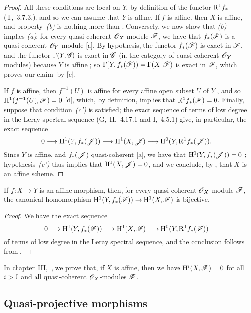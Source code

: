 \begin{proof}
\label{proof-2.5.2.2}
All these conditions are local on $Y$, by definition of the functor $\mathrm{R}^1 f_*$ (T,~3.7.3.), and so we can assume that $Y$ is affine.
If $f$ is affine, then $X$ is affine, and property~\emph{(b)} is nothing more than .
Conversely, we now show that \emph{(b)} implies \emph{(a)}:
for every quasi-coherent $\mathscr{O}_X$-module $\mathscr{F}$, we have that $f_*(\mathscr{F})$ is a quasi-coherent $\mathscr{O}_Y$-module [a].
By hypothesis, the functor $f_*(\mathscr{F})$ is exact in $\mathscr{F}$, and the functor $\Gamma(Y,\mathscr{G})$ is exact in $\mathscr{G}$ (in the category of quasi-coherent $\mathscr{O}_Y$-modules) because $Y$ is affine ;
so $\Gamma(Y,f_*(\mathscr{F}))=\Gamma(X,\mathscr{F})$ is exact in $\mathscr{F}$, which proves our claim, by [c].

If $f$ is affine, then $f^{-1}(U)$ is affine for every affine open subset $U$ of $Y$ , and so $\mathrm{H}^1(f^{-1}(U),\mathscr{F})=0$ [d], which, by definition, implies that $\mathrm{R}^1 f_*(\mathscr{F})=0$.
Finally, suppose that condition~\emph{(c')} is satisfied;
the exact sequence of terms of low degree in the Leray spectral sequence (G,~II,~4.17.1 and I,~4.5.1) give, in particular, the exact sequence
\[
    0\to\HH^1(Y,f_*(\sh{J}))\to\HH^1(X,\sh{J})\to\HH^0(Y,\RR^1 f_*(\sh{J})).
\]
Since $Y$ is affine, and $f_*(\mathscr{J})$ quasi-coherent [a], we have that $\mathrm{H}^1(Y,f_*(\mathscr{J}))=0$ ;
hypothesis~\emph{(c')} thus implies that $\mathrm{H}^1(X,\mathscr{J})=0$, and we conclude, by , that $X$ is an affine scheme.
\end{proof}

\begin{cor}[5.2.3]
\label{2.5.2.3}
If $f:X\to Y$ is an affine morphism, then, for every quasi-coherent $\mathscr{O}_X$-module $\mathscr{F}$, the canonical homomorphism $\HH^1(Y,f_*(\sh{F}))\to\HH^1(X,\sh{F})$ is bijective.
\end{cor}

\begin{proof}
\label{proof-2.5.2.3}
We have the exact sequence
\[
    0\to\HH^1(Y,f_*(\sh{F}))\to\HH^1(X,\sh{F})\to\HH^0(Y,\RR^1 f_*(\sh{F}))
\]
of terms of low degree in the Leray spectral sequence, and the conclusion follows from .
\end{proof}

\begin{rmk}[5.2.4]
\label{2.5.2.4}
In chapter~III,~, we prove that, if $X$ is affine, then we have $\mathrm{H}^i(X,\mathscr{F})=0$ for all $i>0$ and all quasi-coherent $\mathscr{O}_X$-modules $\mathscr{F}$.
\end{rmk}

\subsection{Quasi-projective morphisms}
\label{subsection:quasi-projective-morphisms}
